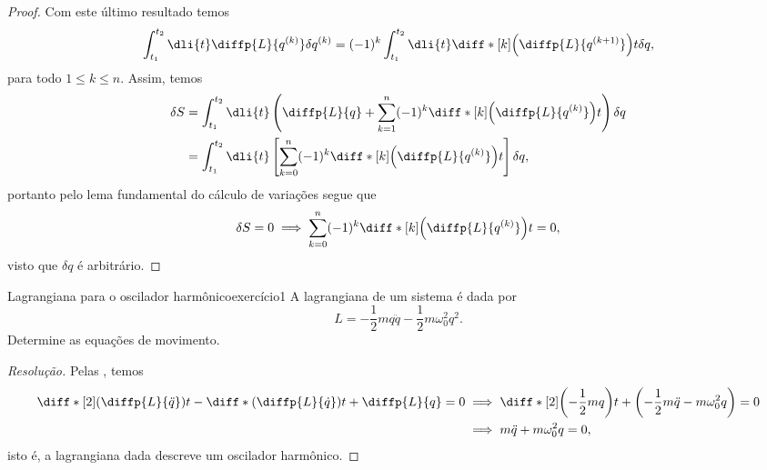 \begin{proof}
    Com este último resultado temos
    \begin{equation*}
        \int_{t_1}^{t_2} \dli{t} \diffp{L}{q^{(k)}}\delta q^{(k)} = (-1)^{k} \int_{t_1}^{t_2} \dli{t} \diff*[k]{\left(\diffp{L}{q^{(k+1)}}\right)}{t} \delta q,
    \end{equation*}
    para todo \(1 \leq k \leq n\). Assim, temos
    \begin{align*}
        \delta S &= \int_{t_1}^{t_2} \dli{t} \left(\diffp{L}{q} + \sum_{k=1}^n (-1)^k\diff*[k]{\left(\diffp{L}{q^{(k)}}\right)}{t}\right)\delta q\\
                 &= \int_{t_1}^{t_2} \dli{t} \left[\sum_{k = 0}^n (-1)^k \diff*[k]{\left(\diffp{L}{q^{(k)}}\right)}{t}\right]\delta q,
    \end{align*}
    portanto pelo lema fundamental do cálculo de variações segue que
    \begin{equation*}
        \delta S = 0 \implies \sum_{k = 0}^n (-1)^k \diff*[k]{\left(\diffp{L}{q^{(k)}}\right)}{t} = 0,
    \end{equation*}
    visto que \(\delta q\) é arbitrário.
\end{proof}

\begin{exercício}{Lagrangiana para o oscilador harmônico}{exercício1}
    A lagrangiana de um sistema é dada por
    \begin{equation*}
        L = -\frac12 m q \ddot{q} - \frac12 m \omega_0^2 q^2.
    \end{equation*}
    Determine as equações de movimento.
\end{exercício}
\begin{proof}[Resolução]
    Pelas , temos
    \begin{align*}
        \diff*[2]{\left(\diffp{L}{\ddot{q}}\right)}{t} - \diff*{\left(\diffp{L}{\dot{q}}\right)}{t} + \diffp{L}{q} = 0 &\implies \diff*[2]{\left(-\frac12mq\right)}{t} + \left(-\frac12m\ddot{q} - m\omega_0^2q\right) = 0\\
                                                                                                                               &\implies m\ddot{q} + m\omega_0^2 q = 0,
    \end{align*}
    isto é, a lagrangiana dada descreve um oscilador harmônico.
\end{proof}
